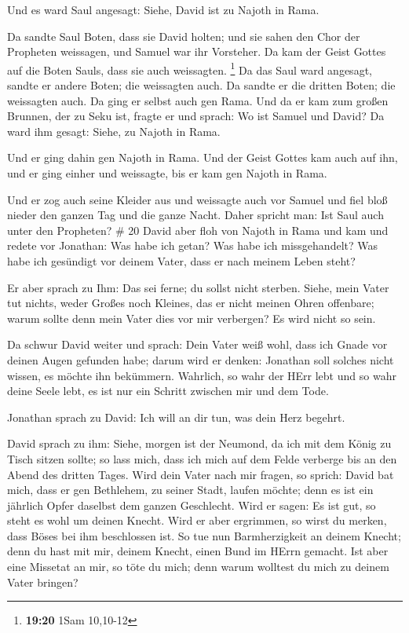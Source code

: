  Und es ward Saul angesagt: Siehe, David ist zu Najoth in
Rama.

 Da sandte Saul Boten, dass sie David holten; und sie sahen
den Chor der Propheten weissagen, und Samuel war ihr Vorsteher. Da kam
der Geist Gottes auf die Boten Sauls, dass sie auch weissagten.
\footnote{\textbf{19:20} 1Sam 10,10-12}  Da das Saul ward
angesagt, sandte er andere Boten; die weissagten auch. Da sandte er die
dritten Boten; die weissagten auch.  Da ging er selbst auch
gen Rama. Und da er kam zum großen Brunnen, der zu Seku ist, fragte er
und sprach: Wo ist Samuel und David? Da ward ihm gesagt: Siehe, zu
Najoth in Rama.

 Und er ging dahin gen Najoth in Rama. Und der Geist Gottes
kam auch auf ihn, und er ging einher und weissagte, bis er kam gen
Najoth in Rama.

 Und er zog auch seine Kleider aus und weissagte auch vor
Samuel und fiel bloß nieder den ganzen Tag und die ganze Nacht. Daher
spricht man: Ist Saul auch unter den Propheten? \# 20  David
aber floh von Najoth in Rama und kam und redete vor Jonathan: Was habe
ich getan? Was habe ich missgehandelt? Was habe ich gesündigt vor deinem
Vater, dass er nach meinem Leben steht?

 Er aber sprach zu Ihm: Das sei ferne; du sollst nicht
sterben. Siehe, mein Vater tut nichts, weder Großes noch Kleines, das er
nicht meinen Ohren offenbare; warum sollte denn mein Vater dies vor mir
verbergen? Es wird nicht so sein.

 Da schwur David weiter und sprach: Dein Vater weiß wohl,
dass ich Gnade vor deinen Augen gefunden habe; darum wird er denken:
Jonathan soll solches nicht wissen, es möchte ihn bekümmern. Wahrlich,
so wahr der HErr lebt und so wahr deine Seele lebt, es ist nur ein
Schritt zwischen mir und dem Tode.

 Jonathan sprach zu David: Ich will an dir tun, was dein
Herz begehrt.

 David sprach zu ihm: Siehe, morgen ist der Neumond, da ich
mit dem König zu Tisch sitzen sollte; so lass mich, dass ich mich auf
dem Felde verberge bis an den Abend des dritten Tages.  Wird
dein Vater nach mir fragen, so sprich: David bat mich, dass er gen
Bethlehem, zu seiner Stadt, laufen möchte; denn es ist ein jährlich
Opfer daselbst dem ganzen Geschlecht.  Wird er sagen: Es ist
gut, so steht es wohl um deinen Knecht. Wird er aber ergrimmen, so wirst
du merken, dass Böses bei ihm beschlossen ist.  So tue nun
Barmherzigkeit an deinem Knecht; denn du hast mit mir, deinem Knecht,
einen Bund im HErrn gemacht. Ist aber eine Missetat an mir, so töte du
mich; denn warum wolltest du mich zu deinem Vater bringen?

